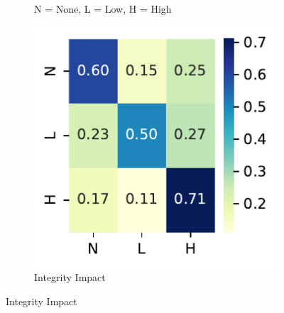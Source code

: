 \documentclass[12pt]{article}
\begin{document}
\begin{figure}
\begin{subfigure}[t]{0.45\textwidth}
		\begin{tablenotes}
			\footnotesize
			\item \quad N = None, L = Low, H = High
		\end{tablenotes}
	\end{subfigure}

	\vspace{1em}

	\begin{subfigure}[t]{0.45\textwidth}
		\includegraphics[width=\textwidth]{./figures/confusion_matrices/integrity_impact_nvd.pdf}
		\caption{Integrity Impact}


\end{subfigure}
\end{figure}
\end{document}
